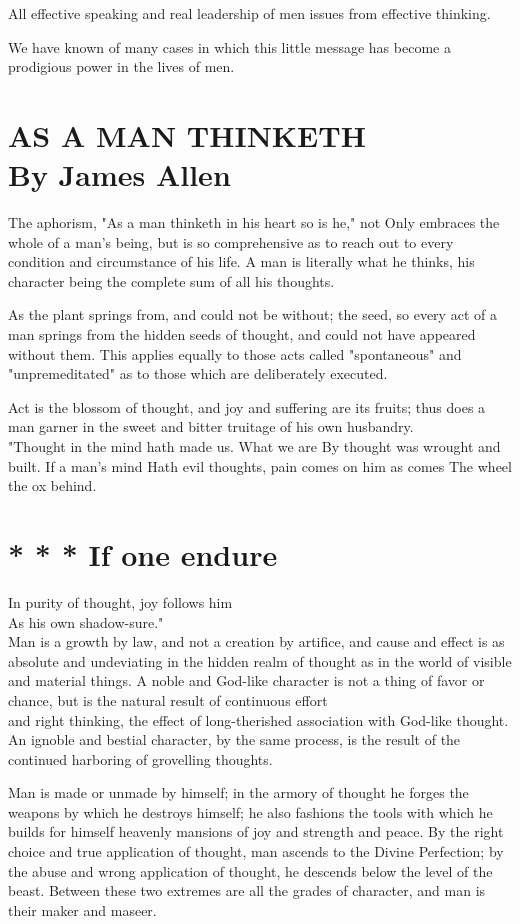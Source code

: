 \documentclass[10pt]{article}
\begin{document}
All effective speaking and real leadership of men issues from effective thinking.

We have known of many cases in which this little message has become a prodigious power in the lives of men.

\section*{AS A MAN THINKETH \\
 By James Allen }
The aphorism, "As a man thinketh in his heart so is he," not Only embraces the whole of a man's being, but is so comprehensive as to reach out to every condition and circumstance of his life. A man is literally what he thinks, his character being the complete sum of all his thoughts.

As the plant springs from, and could not be without; the seed, so every act of a man springs from the hidden seeds of thought, and could not have appeared without them. This applies equally to those acts called "spontaneous" and "unpremeditated" as to those which are deliberately executed.

Act is the blossom of thought, and joy and suffering are its fruits; thus does a man garner in the sweet and bitter truitage of his own husbandry.\\
"Thought in the mind hath made us. What we are By thought was wrought and built. If a man's mind Hath evil thoughts, pain comes on him as comes The wheel the ox behind.

\section*{* * * If one endure}
In purity of thought, joy follows him\\
As his own shadow-sure."\\
Man is a growth by law, and not a creation by artifice, and cause and effect is as absolute and undeviating in the hidden realm of thought as in the world of visible and material things. A noble and God-like character is not a thing of favor or chance, but is the natural result of continuous effort\\
and right thinking, the effect of long-therished association with God-like thought. An ignoble and bestial character, by the same process, is the result of the continued harboring of grovelling thoughts.

Man is made or unmade by himself; in the armory of thought he forges the weapons by which he destroys himself; he also fashions the tools with which he builds for himself heavenly mansions of joy and strength and peace. By the right choice and true application of thought, man ascends to the Divine Perfection; by the abuse and wrong application of thought, he descends below the level of the beast. Between these two extremes are all the grades of character, and man is their maker and maseer.
\end{document}
